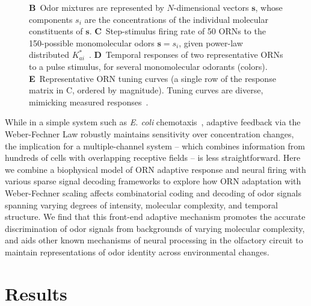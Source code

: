 \documentclass[10pt,prl,aps,showpacs,twocolumn,unsortedaddress]{revtex4-1}
\begin{document}
\begin{figure}[!tb]
{{		\textbf{B}~Odor mixtures are represented by $N$-dimensional vectors $\mathbf s$, whose components $s_i$ are the concentrations of  the individual molecular constituents  of $\mathbf s$. 
		\textbf{C}~Step-stimulus firing rate of 50 ORNs to the 150-possible monomolecular odors $\mathbf s = s_i$, given  power-law distributed $K^*_{ai}$~\cite{si2017invariances}.
		\textbf{D}~Temporal responses of two representative ORNs to a pulse stimulus, for several monomolecular odorants (colors).
		\textbf{E}~Representative ORN tuning curves (a single row of the response matrix in C, ordered by magnitude). Tuning curves are diverse, mimicking measured responses~\cite{hallem_carlson}.
		}}
		\label{fig:tuning_curves}
\end{figure}

While in a simple system such as \textit{E. coli} chemotaxis~\cite{EmonetReview}, adaptive feedback via the Weber-Fechner Law robustly maintains sensitivity over concentration changes, the implication for a multiple-channel system -- which combines information from hundreds of cells with overlapping receptive fields  -- is less straightforward. Here we combine a biophysical model of ORN adaptive response and neural firing with various sparse signal decoding frameworks to explore how ORN adaptation with Weber-Fechner scaling affects combinatorial coding and decoding of odor signals spanning varying degrees of intensity, molecular complexity, and temporal structure. We find that this front-end adaptive mechanism promotes the accurate discrimination of odor signals from backgrounds of varying molecular complexity, and aids other known mechanisms of neural processing in the olfactory circuit to maintain representations of odor identity across environmental changes. %


\section*{Results}



\end{document}
